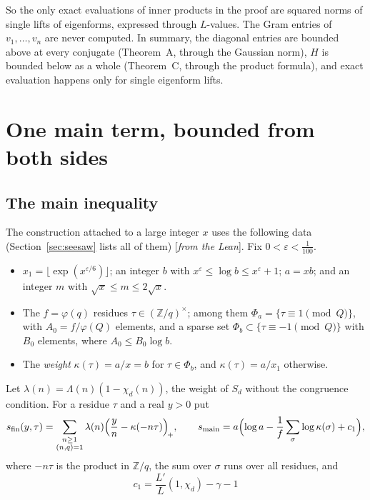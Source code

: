 \documentclass[11pt]{amsart}
\numberwithin{equation}{section}
\theoremstyle{definition}
\theoremstyle{remark}
\newcommand{\Z}{\mathbb Z}
\newcommand{\status}[1]{\textup{[\emph{#1}]}}
\begin{document}
So the only exact evaluations of inner products in the proof are squared norms of single lifts of eigenforms, expressed through $L$-values. The Gram entries of $v_1,\dots,v_n$ are never computed. In summary, the diagonal entries are bounded above at every conjugate (Theorem~A, through the Gaussian norm), $H$ is bounded below as a whole (Theorem~C, through the product formula), and exact evaluation happens only for single eigenform lifts.

\section{One main term, bounded from both sides}\label{sec:abc}

\subsection*{The main inequality}
The construction attached to a large integer $x$ uses the following data (Section~\ref{sec:seesaw} lists all of them) \status{from the Lean}. Fix $0<\varepsilon<\frac1{100}$.
\begin{itemize}[leftmargin=2em]
\item $x_1=\lfloor\exp(x^{\varepsilon/6})\rfloor$; an integer $b$ with $x^\varepsilon\le\log b\le x^\varepsilon+1$; $a=xb$; and an integer $m$ with $\sqrt x\le m\le2\sqrt x$.
\item The $f=\varphi(q)$ residues $\tau\in(\Z/q)^\times$; among them $\Phi_a=\{\tau\equiv1\pmod Q\}$, with $A_0=f/\varphi(Q)$ elements, and a sparse set $\Phi_b\subset\{\tau\equiv-1\pmod Q\}$ with $B_0$ elements, where $A_0\le B_0\log b$.
\item The \emph{weight} $\kappa(\tau)=a/x=b$ for $\tau\in\Phi_b$, and $\kappa(\tau)=a/x_1$ otherwise.
\end{itemize}
Let $\lambda(n)=\Lambda(n)(1-\chi_d(n))$, the weight of $S_d$ without the congruence condition. For a residue $\tau$ and a real $y>0$ put
\begin{equation}\label{eq:sfin}
 s_{\mathrm{fin}}(y,\tau)=\sum_{\substack{n\ge1\\(n,q)=1}}\lambda(n)\Bigl(\frac yn-\kappa(-n\tau)\Bigr)_{\!+},\qquad
 s_{\mathrm{main}}=a\Bigl(\log a-\frac1f\sum_{\sigma}\log\kappa(\sigma)+c_1\Bigr),
\end{equation}
where $-n\tau$ is the product in $\Z/q$, the sum over $\sigma$ runs over all residues, and
\begin{equation}\label{eq:c1}
 c_1=\frac{L'}{L}(1,\chi_d)-\gamma-1
\end{equation}
\end{document}
